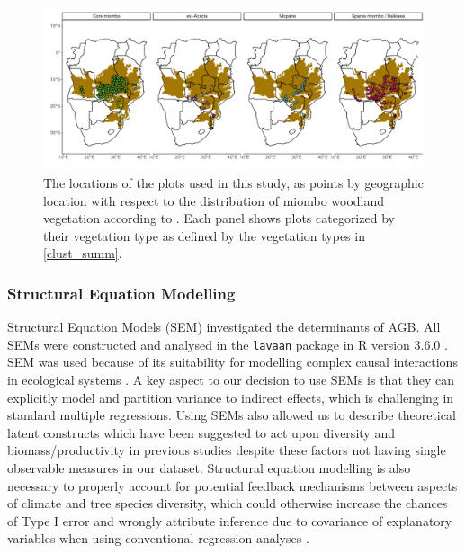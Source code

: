 \documentclass[11pt,a4paper]{article}
\begin{document}
\begin{landscape}


\begin{figure}[H]
\centering
	\includegraphics[width=1.4\textwidth]{clust_map}
	\caption{The locations of the \nplots{} plots used in this study, as points by geographic location with respect to the distribution of miombo woodland vegetation according to \citet{White1983}. Each panel shows plots categorized by their vegetation type as defined by the vegetation types in \autoref{clust_summ}.}
	\label{clust_map}
\end{figure}
\end{landscape}

\subsubsection*{Structural Equation Modelling}

Structural Equation Models (SEM) investigated the determinants of AGB. All SEMs were constructed and analysed in the \verb|lavaan| package \citep{lavaan} in R version 3.6.0 \citep{R2019}. SEM was used because of its suitability for modelling complex causal interactions in ecological systems \citep{Lee2007}. A key aspect to our decision to use SEMs is that they can explicitly model and partition variance to indirect effects, which is challenging in standard multiple regressions. Using SEMs also allowed us to describe theoretical latent constructs which have been suggested to act upon diversity and biomass/productivity in previous studies despite these factors not having single observable measures in our dataset. Structural equation modelling is also necessary to properly account for potential feedback mechanisms between aspects of climate and tree species diversity, which could otherwise increase the chances of Type I error and wrongly attribute inference due to covariance of explanatory variables when using conventional regression analyses \citep{Nachtigall2003}.
\end{document}
